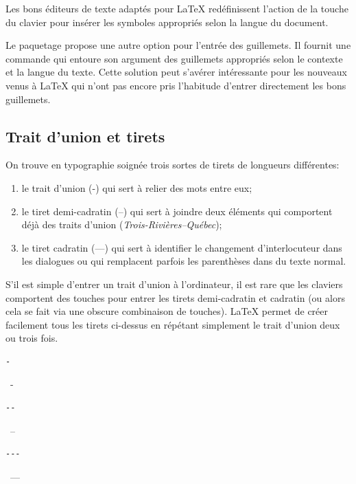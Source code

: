 Les bons éditeurs de texte adaptés pour {\LaTeX} redéfinissent
l'action de la touche \fbox{\texttt{\textquotedbl}} du clavier pour
insérer les symboles appropriés selon la langue du document.

Le paquetage  \citep{csquotes} propose une autre option
pour l'entrée des guillemets. Il fournit une commande
\cmdprint{\enquote} qui entoure son argument des guillemets appropriés
selon le contexte et la langue du texte. Cette solution peut s'avérer
intéressante pour les nouveaux venus à {\LaTeX} qui n'ont pas encore
pris l'habitude d'entrer directement les bons guillemets.

\subsection{Trait d'union et tirets}
\label{sec:bases:caracteres:tirets}

On trouve en typographie soignée trois sortes de tirets de longueurs
différentes:
\begin{enumerate}
\item le trait d'union (-) qui sert à relier des mots entre eux;
\item le tiret demi-cadratin (--) qui sert à joindre deux éléments qui
  comportent déjà des traits d'union (\emph{Trois-Rivières--Québec});
\item le tiret cadratin (---) qui sert à identifier le changement
  d'interlocuteur dans les dialogues ou qui remplacent parfois les
  parenthèses dans du texte normal.
\end{enumerate}

S'il est simple d'entrer un trait d'union à l'ordinateur, il est rare
que les claviers comportent des touches pour entrer les tirets
demi-cadratin et cadratin (ou alors cela se fait via une obscure
combinaison de touches). {\LaTeX} permet de créer facilement tous les
tirets ci-dessus en répétant simplement le trait d'union deux ou trois
fois.
\begin{demo}
  \begin{minipage}{0.2\linewidth}
    \begin{texample}
\begin{lstlisting}
-
\end{lstlisting}
      \producing\ -
    \end{texample}
  \end{minipage}
  \hfill
  \begin{minipage}{0.2\linewidth}
    \begin{texample}
\begin{lstlisting}
--
\end{lstlisting}
      \producing\ --
    \end{texample}
  \end{minipage}
  \hfill
  \begin{minipage}{0.2\linewidth}
    \begin{texample}
\begin{lstlisting}
---
\end{lstlisting}
      \producing\ ---
    \end{texample}
  \end{minipage}
\end{demo}


